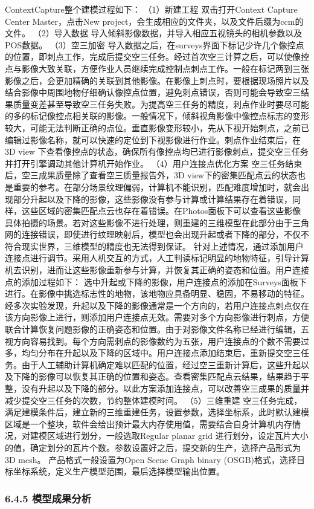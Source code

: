 ContextCapture整个建模过程如下： （1）新建工程 双击打开Context Capture Center Master，点击New project，会生成相应的文件夹，以及文件后缀为ccm的文件。 （2）导入数据
导入倾斜影像数据，并导入相应五视镜头的相机参数以及POS数据。 （3）空三加密
导入数据之后，在surveys界面下标记少许几个像控点的位置，即刺点工作，完成后提交空三任务。经过首次空三计算之后，可以使像控点与影像大致关联，方便作业人员继续完成控制点刺点工作。一般在标记两到三张影像之后，会更加精确的关联到其他影像。在影像上刺点时，要根据现场照片以及结合影像中周围地物仔细确认像控点位置，避免刺点错误，否则可能会导致空三结果质量变差甚至导致空三任务失败。为提高空三任务的精度，刺点作业时要尽可能的多的标记像控点相关联的影像。一般情况下，倾斜视角影像中像控点标志的变形较大，可能无法判断正确的点位。垂直影像变形较小，先从下视开始刺点，之前已编辑过影像名称，就可以快速的定位到下视影像进行作业。刺点作业结束后，在3D
view 下查看像控点的状态，确保所有像控点均已进行影像刺点，提交空三任务并打开引擎调动其他计算机开始作业。 （4）用户连接点优化方案 空三任务结束后，空三成果质量除了查看空三质量报告外，3D
view下的密集匹配点云的状态也是重要的参考。在部分场景纹理偏弱，计算机不能识别，匹配难度增加时，就会出现部分升起以及下降的影像，这些影像没有参与计算或计算结果存在着错误，同样，这些区域的密集匹配点云也存在着错误。在Photos面板下可以查看这些影像具体拍摄的场景。若对这些影像不进行处理，则重建的三维模型在此部分由于三角网的连接错误，即使进行纹理映射后，模型也会出现升起或者下降的部分，不仅不符合现实世界，三维模型的精度也无法得到保证。
针对上述情况，通过添加用户连接点进行调节。采用人机交互的方式，人工判读标记明显的地物特征，引导计算机去识别，进而让这些影像重新参与计算，并恢复其正确的姿态和位置。用户连接点的添加过程如下：
选中升起或下降的影像，用户连接点的添加在Surveys面板下进行。在影像中挑选标志性的地物，该地物应具备明显、稳固，不易移动的特征。经多次实验发现，升起以及下降的影像通常是一个方向的，若用户连接点刺点仅在该方向影像上进行，则添加用户连接点无效。需要对多个方向影像进行刺点，方便联合计算恢复问题影像的正确姿态和位置。由于对影像文件名称已经进行编辑，五视方向容易找到。每个方向需刺点的影像数约为五张，用户连接点的个数不需要过多，均匀分布在升起以及下降的区域中。用户连接点添加结束后，重新提交空三任务。由于人工辅助计算机确定难以匹配的位置，经过空三重新计算后，这些升起以及下降的影像可以恢复其正确的位置和姿态。查看密集匹配点云结果，结果趋于平整，没有升起以及下降的部分。以此方案添加连接点，可以改善空三成果的质量并减少提交空三任务的次数，节约整体建模时间。
（5）三维重建 空三任务完成，满足建模条件后，建立新的三维重建任务，设置参数，选择坐标系，此时默认建模区域是一个整块，软件会给出预计最大内存使用值，需要结合自身计算机内存情况，对建模区域进行划分，一般选取Regular planar
grid 进行划分，设定瓦片大小的值，确定划分的瓦片个数。参数设置好之后，提交新的生产，选择产品形式为3D mesh。 产品格式一般设置为Open Scene Graph binary
(OSGB)格式，选择目标坐标系统，定义生产模型范围，最后选择模型输出位置。 \subsubsection{6.4.5 模型成果分析}\label{ux6a21ux578bux6210ux679cux5206ux6790}

